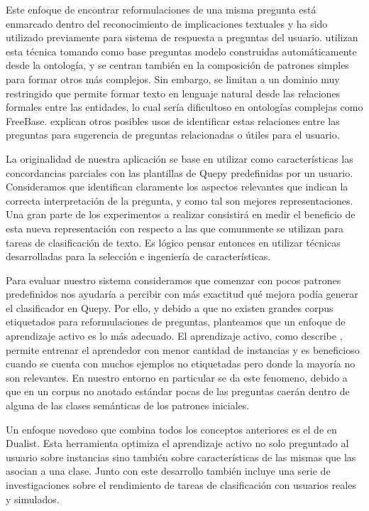 Este enfoque de encontrar reformulaciones de una misma pregunta está enmarcado dentro del reconocimiento de implicaciones textuales y ha sido utilizado previamente para sistema de respuesta a preguntas del usuario. \citet{ou_entailement} utilizan esta técnica tomando como base preguntas modelo construidas automáticamente desde la ontología, y se centran también en la composición de patrones simples para formar otros más complejos. Sin embargo, se limitan a un dominio muy restringido que permite formar texto en lenguaje natural desde las relaciones formales entre las entidades, lo cual sería dificultoso en ontologías complejas como FreeBase. \citet{rui_relations} explican otros posibles usos de identificar estas relaciones entre las preguntas para sugerencia de preguntas relacionadas o útiles para el usuario.

La originalidad de nuestra aplicación se base en utilizar como características las concordancias parciales con las plantillas de Quepy predefinidas por un usuario. Consideramos que identifican claramente los aspectos relevantes que indican la correcta interpretación de la pregunta, y como tal son mejores representaciones. Una gran parte de los experimentos a realizar consistirá en medir el beneficio de esta nueva representación con respecto a las que comunmente se utilizan para tareas de clasificación de texto. Es lógico pensar entonces en utilizar técnicas desarrolladas para la selección e ingeniería de características.

Para evaluar nuestro sistema consideramos que comenzar con pocos patrones predefinidos nos ayudaría a percibir con más exactitud qué mejora podía generar el clasificador en Quepy. Por ello, y debido a que no existen grandes corpus etiquetados para reformulaciones de preguntas, planteamos que un enfoque de aprendizaje activo es lo más adecuado. El aprendizaje activo, como describe \citet{settles_active_learning_survey}, permite entrenar el aprendedor con menor cantidad de instancias y es beneficioso cuando se cuenta con muchos ejemplos no etiquetadas pero donde la mayoría no son relevantes. En nuestro entorno en particular se da este fenomeno, debido a que en un corpus no anotado estándar pocas de las preguntas caerán dentro de alguna de las clases semánticas de los patrones iniciales.

Un enfoque novedoso que combina todos los conceptos anteriores es el de \citet{dualist} en Dualist. Esta herramienta optimiza el aprendizaje activo no solo preguntado al usuario sobre instancias sino también sobre características de las mismas que las asocian a una clase. Junto con este desarrollo también incluye una serie de investigaciones sobre el rendimiento de tareas de clasificación con usuarios reales y simulados.

